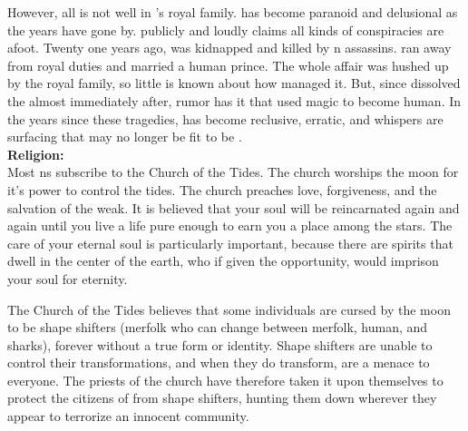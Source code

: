 \documentclass[blue]{NeptuneBall}
\begin{document}
However, all is not well in \pAtlantis{}'s royal family. \cPlant{\Prince} \cPlant{} has become paranoid and delusional as the years have gone by. \cPlant{\They} publicly and loudly claims all kinds of conspiracies are afoot. Twenty one years ago, \cQueen{\King} \cQueen{} was kidnapped and killed by \pPacifica{}n assassins. \cAriel{\Prince} \cAriel{} ran away from \cAriel{\their} royal duties and married a human prince. The whole affair was hushed up by the royal family, so little is known about how \cAriel{\they{}} managed it. But, since \cKing{} dissolved the \pMagician{} almost immediately after, rumor has it that \cAriel{\they} used magic to become human. In the years since these tragedies, \cKing{} has become reclusive, erratic, and whispers are surfacing that \cKing{\they{}} may no longer be fit to be \cKing{\King}.\\

{\bf Religion:}\\
Most \pAtlantis{}ns subscribe to the Church of the Tides. The church worships the moon for it's power to control the tides. The church preaches love, forgiveness, and the salvation of the weak. It is believed that your soul will be reincarnated again and again until you live a life pure enough to earn you a place among the stars. The care of your eternal soul is particularly important, because there are spirits that dwell in the center of the earth, who if given the opportunity, would imprison your soul for eternity.

The Church of the Tides believes that some individuals are cursed by the moon to be shape shifters (merfolk who can change between merfolk, human, and sharks), forever without a true form or identity. Shape shifters are unable to control their transformations, and when they do transform, are a menace to everyone. The priests of the church have therefore taken it upon themselves to protect the citizens of \pAtlantis{} from shape shifters, hunting them down wherever they appear to terrorize an innocent community.\\
\end{document}
